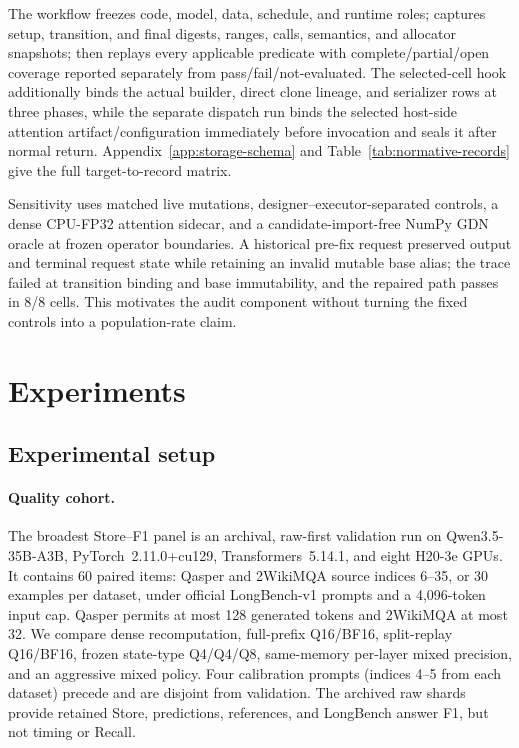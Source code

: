 \documentclass{article}
\begin{document}
The workflow freezes code, model, data, schedule, and runtime roles; captures
setup, transition, and final digests, ranges, calls, semantics, and allocator
snapshots; then replays every applicable predicate with complete/partial/open
coverage reported separately from pass/fail/not-evaluated.  The selected-cell
hook additionally binds the actual builder, direct clone lineage, and serializer
rows at three phases, while the separate dispatch run binds the selected
host-side attention artifact/configuration immediately before invocation and
seals it after normal return.  Appendix~\ref{app:storage-schema} and
Table~\ref{tab:normative-records} give the full target-to-record matrix.

Sensitivity uses matched live mutations, designer--executor-separated controls,
a dense CPU-FP32 attention sidecar, and a candidate-import-free NumPy GDN oracle
at frozen operator boundaries.  A historical pre-fix request preserved output
and terminal request state while retaining an invalid mutable base alias; the
trace failed at transition binding and base immutability, and the repaired path
passes in 8/8 cells.  This motivates the audit component without turning the
fixed controls into a population-rate claim.
\section{Experiments}
\label{sec:experiments}
\label{sec:protocol}

\subsection{Experimental setup}

\paragraph{Quality cohort.}
The broadest Store--F1 panel is an archival, raw-first validation run on
Qwen3.5-35B-A3B, PyTorch~2.11.0+cu129, Transformers~5.14.1, and eight H20-3e
GPUs.  It contains 60 paired items: Qasper and 2WikiMQA source indices 6--35,
or 30 examples per dataset, under official LongBench-v1 prompts and a
4,096-token input cap.  Qasper permits at most 128 generated tokens and
2WikiMQA at most 32.  We compare dense recomputation, full-prefix Q16/BF16,
split-replay Q16/BF16, frozen state-type Q4/Q4/Q8, same-memory per-layer mixed
precision, and an aggressive mixed policy.  Four calibration prompts (indices
4--5 from each dataset) precede and are disjoint from validation.  The archived
raw shards provide retained Store, predictions, references, and LongBench
answer F1, but not timing or Recall.
\end{document}
